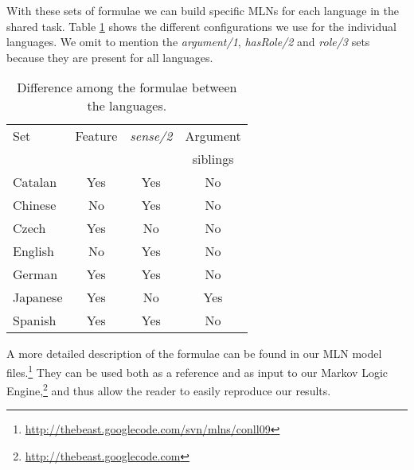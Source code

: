 With these sets of formulae we can build specific MLNs for each language in 
the shared task. Table \ref{tbl:diff} shows the different configurations we use for the individual languages. We 
omit to mention the \emph{argument/1}, \emph{hasRole/2} and \emph{role/3} sets because they 
are present for all languages. 


\begin{table}
\begin{center}
\small
\begin{tabular}{|l|c|c|c|}\hline
    Set         & Feature   & \emph{sense/2}  & Argument \\
                &            &        & siblings  \\\hline\hline
Catalan         &   Yes      &  Yes   &  No  \\
Chinese         &   No       &  Yes   &  No  \\
Czech           &   Yes      &  No    &  No  \\
English         &   No       &  Yes   &  No  \\
German          &   Yes      &  Yes   &  No  \\
Japanese        &   Yes      &  No    &  Yes \\
Spanish         &   Yes      &  Yes   &  No  \\
\hline
\end{tabular}
\caption{Difference among the formulae between the languages.}
\label{tbl:diff}
\normalsize
\end{center}
\end{table}

A more detailed description of the formulae can be found in our MLN model files.\footnote{\url{http://thebeast.googlecode.com/svn/mlns/conll09}} They can be 
used both as a reference and as input to our Markov Logic Engine,\footnote{\url{http://thebeast.googlecode.com}} and thus allow the reader 
to easily reproduce our results.


